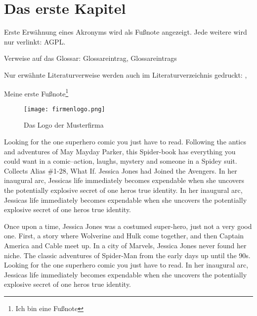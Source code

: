 
\chapter{Das erste Kapitel}
Erste Erwähnung eines Akronyms wird als Fußnote angezeigt. Jede weitere wird
nur verlinkt: \acf{AGPL}. \autocite{fsf:2007}

Verweise auf das Glossar: \gls{Glossareintrag}, \glspl{Glossareintrag}

Nur erwähnte Literaturverweise werden auch im Literaturverzeichnis gedruckt:
\autocite{baumgartner:2002}, \autocite{dreyfus:1980}

Meine erste Fußnote\footnote{Ich bin eine Fußnote}

\begin{wrapfigure}{r}{.4\textwidth}
	\centering
	\texttt{[image: firmenlogo.png]}
	\vspace{-15pt}
	\caption{Das Logo der Musterfirma\footnotemark}
\end{wrapfigure}
Looking for the one superhero comic you just have to read. Following the antics and adventures of May Mayday Parker, this Spider-book has everything you could want in a comic--action, laughs, mystery and someone in a Spidey suit. Collects Alias \#1-28, What If. Jessica Jones had Joined the Avengers. In her inaugural arc, Jessicas life immediately becomes expendable when she uncovers the potentially explosive secret of one heros true identity. In her inaugural arc, Jessicas life immediately becomes expendable when she uncovers the potentially explosive secret of one heros true identity.

Once upon a time, Jessica Jones was a costumed super-hero, just not a very good one. First, a story where Wolverine and Hulk come together, and then Captain America and Cable meet up. In a city of Marvels, Jessica Jones never found her niche. The classic adventures of Spider-Man from the early days up until the 90s. Looking for the one superhero comic you just have to read. In her inaugural arc, Jessicas life immediately becomes expendable when she uncovers the potentially explosive secret of one heros true identity.